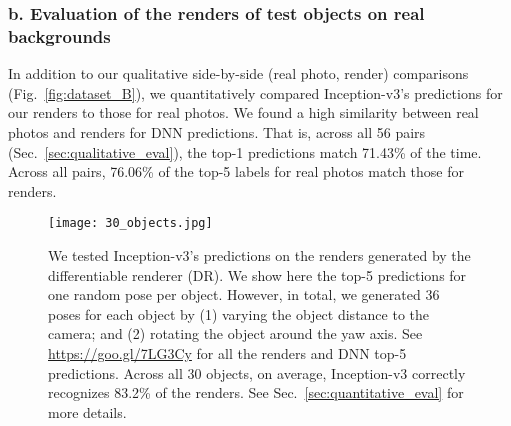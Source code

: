\documentclass[10pt,twocolumn,letterpaper]{article}
\begin{document}
\subsubsection*{b. Evaluation of the renders of test objects on real backgrounds}

In addition to our qualitative side-by-side (real photo, render) comparisons (Fig.~\ref{fig:dataset_B}), we quantitatively compared Inception-v3's predictions for our renders to those for real photos.
We found a high similarity between real photos and renders for DNN predictions.
That is, across all 56 pairs (Sec.~\ref{sec:qualitative_eval}), the top-1 predictions match 71.43\% of the time.
Across all pairs, 76.06\% of the top-5 labels for real photos match those for renders.

\begin{figure*}
    \centering
    \texttt{[image: 30\_objects.jpg]}
    \caption{    	
    	We tested Inception-v3's predictions on the renders generated by the differentiable renderer (DR).
    	We show here the top-5 predictions for one random pose per object. 
    	However, in total, we generated 36 poses for each object by (1) varying the object distance to the camera; and (2) rotating the object around the yaw axis.
    	See \url{https://goo.gl/7LG3Cy} for all the renders and DNN top-5 predictions.
    	Across all 30 objects, on average, Inception-v3 correctly recognizes 83.2\% of the renders.
    	See Sec.~\ref{sec:quantitative_eval} for more details.
    }\label{fig:dataset_A}
\end{figure*}
\end{document}
